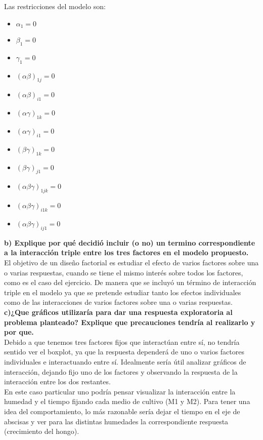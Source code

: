 \documentclass[11pt]{article}
\providecommand{\tightlist}{%
      \setlength{\itemsep}{0pt}\setlength{\parskip}{0pt}}
\begin{document}
Las restricciones del modelo son:

\begin{itemize}
\tightlist
\item
  \(\alpha_1 = 0\)
\item
  \(\beta_1 = 0\)
\item
  \(\gamma_1 = 0\)
\item
  \((\alpha \beta)_{1j} = 0\)
\item
  \((\alpha \beta)_{i1} = 0\)
\item
  \((\alpha \gamma)_{1k} = 0\)
\item
  \((\alpha \gamma)_{i1} = 0\)
\item
  \((\beta \gamma)_{1k} = 0\)
\item
  \((\beta \gamma)_{j1} = 0\)
\item
  \((\alpha \beta \gamma)_{1jk} = 0\)
\item
  \((\alpha \beta \gamma)_{i1k} = 0\)
\item
  \((\alpha \beta \gamma)_{ij1} = 0\)
\end{itemize}

    \textbf{b) Explique por qué decidió incluir (o no) un termino
correspondiente a la interacción triple entre los tres factores en el
modelo propuesto.}\\

El objetivo de un diseño factorial es estudiar el efecto de varios factores sobre una o varias respuestas, cuando se tiene el mismo interés sobre todos los factores, como es el caso del ejercicio. De manera que se incluyó un término de interacción triple en el modelo ya que se pretende estudiar tanto los efectos individuales como de las interacciones de varios factores sobre una o varias respuestas.\\

    \textbf{c)¿Que gráficos utilizaría para dar una respuesta exploratoria
al problema planteado? Explique que precauciones tendría al realizarlo y
por que.} \\

Debido a que tenemos tres factores fijos que interactúan entre sí, no
tendría sentido ver el boxplot, ya que la respuesta dependerá de uno o varios factores individuales e interactuando entre sí. Idealmente sería útil analizar gráficos de interacción, dejando fijo uno de los factores y observando la respuesta de la interacción entre los dos restantes. \\

En este caso particular uno podría pensar visualizar la interacción entre la humedad y el tiempo fijando cada medio de cultivo (M1 y M2). Para tener una idea del comportamiento, lo más razonable sería dejar el tiempo en el eje de abscisas y ver para las distintas humedades la correspondiente respuesta (crecimiento del hongo).\\
\end{document}
